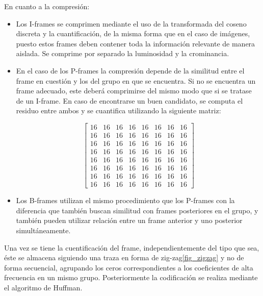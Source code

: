 En cuanto a la compresión:
\begin{itemize}
\item Los I-frames se comprimen mediante el uso de la transformada del coseno discreta y la cuantificación, de la misma forma que en el caso de imágenes, puesto estos frames deben contener toda la información relevante de manera aislada. Se comprime por separado la luminosidad y la crominancia.
\item En el caso de los P-frames la compresión depende de la similitud entre el frame en cuestión y los del grupo en que se encuentra. Si no se encuentra un frame adecuado, este deberá comprimirse del mismo modo que si se tratase de un I-frame. En caso de encontrarse un buen candidato, se computa el residuo entre ambos y se cuantifica utilizando la siguiente matriz:

$$
\begin{bmatrix}
16 & 16 & 16 & 16 & 16 & 16 & 16 & 16 \\
16 & 16 & 16 & 16 & 16 & 16 & 16 & 16 \\
16 & 16 & 16 & 16 & 16 & 16 & 16 & 16 \\
16 & 16 & 16 & 16 & 16 & 16 & 16 & 16 \\
16 & 16 & 16 & 16 & 16 & 16 & 16 & 16 \\
16 & 16 & 16 & 16 & 16 & 16 & 16 & 16 \\
16 & 16 & 16 & 16 & 16 & 16 & 16 & 16 \\
16 & 16 & 16 & 16 & 16 & 16 & 16 & 16 
\end{bmatrix}
$$

\item Los B-frames utilizan el mismo procedimiento que los P-frames con la diferencia que también buscan similitud con frames posteriores en el grupo, y también pueden utilizar relación entre un frame anterior y uno posterior simultáneamente. 
\end{itemize}

Una vez se tiene la cuentificación del frame, independientemente del tipo que sea, éste se almacena siguiendo una traza en forma de zig-zag\ref{fig_zigzag} y no de forma secuencial, agrupando los ceros correspondientes a los coeficientes de alta frecuencia en un mismo grupo. Posteriormente la codificación se realiza mediante el algoritmo de Huffman\cite{wiki:huffman}.

